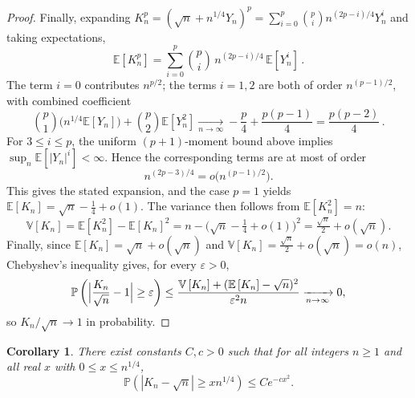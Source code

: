 \documentclass[english,11pt]{smfart}
\newcommand{\Prb}[1]{\mathbb{P}\left(#1\right)}
\newcommand{\Exb}[1]{\mathbb{E}\left[#1\right]}
\newcommand{\Vab}[1]{\mathbb{V}\left[#1\right]}
\newtheorem{corollary}[theorem]{Corollary}
\numberwithin{equation}{section}
\begin{document}
\begin{proof}
Finally, expanding $K_n^{p}=(\sqrt n+n^{1/4}Y_n)^{p}=\sum_{i=0}^{p}\binom{p}{i}
n^{(2p-i)/4}Y_n^{i}$ and taking expectations,
\[
  \Exb{K_n^{p}}=\sum_{i=0}^{p}\binom{p}{i}\,n^{(2p-i)/4}\,\Exb{Y_n^{i}}\,.
\]
The term $i=0$ contributes $n^{p/2}$; the terms $i=1,2$ are both of order
$n^{(p-1)/2}$, with combined coefficient
\[
  \binom{p}{1}\bigl(n^{1/4}\Exb{Y_n}\bigr)+\binom{p}{2}\Exb{Y_n^{2}}
  \xrightarrow[n\to\infty]{}
  -\frac{p}{4}+\frac{p(p-1)}{4}=\frac{p(p-2)}{4}\,.
\]
For $3\le i\le p$, the uniform $(p+1)$-moment bound above implies
$\sup_n\Exb{|Y_n|^i}<\infty$. Hence the corresponding terms are at most of order
\[
  n^{(2p-3)/4}=o\bigl(n^{(p-1)/2}\bigr).
\]
This gives the stated expansion, and the case $p=1$ yields
$\Exb{K_n}=\sqrt n-\tfrac14+o(1)$. The variance then follows from
$\Exb{K_n^2}=n$:
\[
  \Vab{K_n}=\Exb{K_n^2}-\Exb{K_n}^2
  =n-\bigl(\sqrt n-\tfrac14+o(1)\bigr)^2=\tfrac{\sqrt n}{2}+o(\sqrt n).
\]
Finally, since $\Exb{K_n}=\sqrt n+o(\sqrt n)$ and
$\Vab{K_n}=\tfrac{\sqrt n}{2}+o(\sqrt n)=o(n)$, Chebyshev's inequality gives, for
every $\varepsilon>0$,
\[
  \Prb{\Bigl|\frac{K_n}{\sqrt n}-1\Bigr|\ge\varepsilon}
  \le\frac{\Vab{K_n}+(\Exb{K_n}-\sqrt n)^2}{\varepsilon^2 n}
  \xrightarrow[n\to\infty]{}0,
\]
so $K_n/\sqrt n\to1$ in probability.
\end{proof}


\begin{corollary}
\label{co:tttail}
There exist constants $C,c>0$ such that for all integers $n\ge1$ and all real
$x$ with $0\le x\le n^{1/4}$,
\[
  \Prb{|K_n-\sqrt n|\ge x n^{1/4}}\le C e^{-c x^2}.
\]
\end{corollary}
\end{document}
